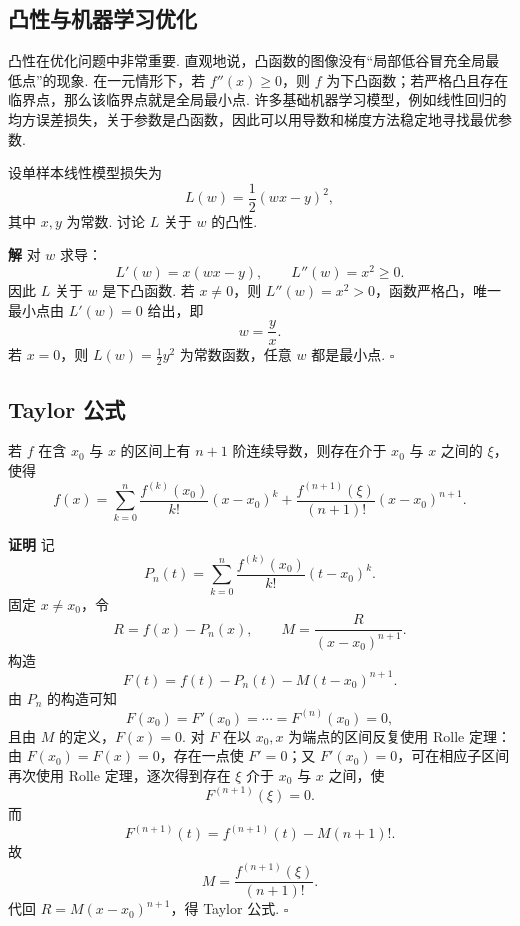 \documentclass[fontset=fandol]{ctexart}
\newenvironment{proofdetail}{\par\noindent\textbf{证明}\quad}{\hfill$\square$\par\vspace{0.8em}}
\newenvironment{solution}{\par\noindent\textbf{解}\quad}{\hfill$\square$\par\vspace{0.8em}}
\begin{document}
\begin{center}
\end{center}


\subsection{凸性与机器学习优化}

凸性在优化问题中非常重要. 直观地说，凸函数的图像没有“局部低谷冒充全局最低点”的现象. 在一元情形下，若 $f''(x)\ge0$，则 $f$ 为下凸函数；若严格凸且存在临界点，那么该临界点就是全局最小点. 许多基础机器学习模型，例如线性回归的均方误差损失，关于参数是凸函数，因此可以用导数和梯度方法稳定地寻找最优参数.

\begin{example}
设单样本线性模型损失为
\[
L(w)=\frac12(wx-y)^2,
\]
其中 $x,y$ 为常数. 讨论 $L$ 关于 $w$ 的凸性.
\end{example}
\begin{solution}
对 $w$ 求导：
\[
L'(w)=x(wx-y),\qquad L''(w)=x^2\ge0.
\]
因此 $L$ 关于 $w$ 是下凸函数. 若 $x\neq0$，则 $L''(w)=x^2>0$，函数严格凸，唯一最小点由 $L'(w)=0$ 给出，即
\[
w=\frac{y}{x}.
\]
若 $x=0$，则 $L(w)=\frac12y^2$ 为常数函数，任意 $w$ 都是最小点.
\end{solution}

\subsection{Taylor 公式}

\begin{theorem}
若 $f$ 在含 $x_0$ 与 $x$ 的区间上有 $n+1$ 阶连续导数，则存在介于 $x_0$ 与 $x$ 之间的 $\xi$，使得
\[
f(x)=\sum_{k=0}^{n}\frac{f^{(k)}(x_0)}{k!}(x-x_0)^k
+\frac{f^{(n+1)}(\xi)}{(n+1)!}(x-x_0)^{n+1}.
\]
\end{theorem}
\begin{proofdetail}
记
\[
P_n(t)=\sum_{k=0}^{n}\frac{f^{(k)}(x_0)}{k!}(t-x_0)^k.
\]
固定 $x\neq x_0$，令
\[
R=f(x)-P_n(x),\qquad
M=\frac{R}{(x-x_0)^{n+1}}.
\]
构造
\[
F(t)=f(t)-P_n(t)-M(t-x_0)^{n+1}.
\]
由 $P_n$ 的构造可知
\[
F(x_0)=F'(x_0)=\cdots=F^{(n)}(x_0)=0,
\]
且由 $M$ 的定义，$F(x)=0$. 对 $F$ 在以 $x_0,x$ 为端点的区间反复使用 Rolle 定理：由 $F(x_0)=F(x)=0$，存在一点使 $F'=0$；又 $F'(x_0)=0$，可在相应子区间再次使用 Rolle 定理，逐次得到存在 $\xi$ 介于 $x_0$ 与 $x$ 之间，使
\[
F^{(n+1)}(\xi)=0.
\]
而
\[
F^{(n+1)}(t)=f^{(n+1)}(t)-M(n+1)!.
\]
故
\[
M=\frac{f^{(n+1)}(\xi)}{(n+1)!}.
\]
代回 $R=M(x-x_0)^{n+1}$，得 Taylor 公式.
\end{proofdetail}
\end{document}
